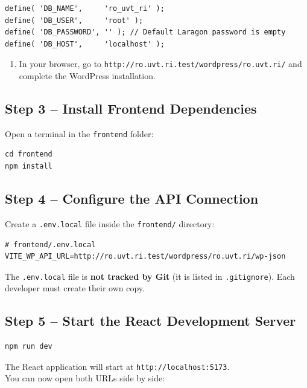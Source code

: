 \documentclass[11pt,a4paper]{article}
\begin{document}
\begin{lstlisting}
define( 'DB_NAME',     'ro_uvt_ri' );
define( 'DB_USER',     'root' );
define( 'DB_PASSWORD', '' ); // Default Laragon password is empty
define( 'DB_HOST',     'localhost' );
\end{lstlisting}

\begin{enumerate}[leftmargin=1.5em, resume]
    \item In your browser, go to \texttt{http://ro.uvt.ri.test/wordpress/ro.uvt.ri/} and complete the WordPress installation.
\end{enumerate}

\subsection{Step 3 -- Install Frontend Dependencies}

Open a terminal in the \texttt{frontend} folder:

\begin{lstlisting}
cd frontend
npm install
\end{lstlisting}

\subsection{Step 4 -- Configure the API Connection}

Create a \texttt{.env.local} file inside the \texttt{frontend/} directory:

\begin{lstlisting}
# frontend/.env.local
VITE_WP_API_URL=http://ro.uvt.ri.test/wordpress/ro.uvt.ri/wp-json
\end{lstlisting}

\begin{warningbox}
The \texttt{.env.local} file is \textbf{not tracked by Git} (it is listed
in \texttt{.gitignore}). Each developer must create their own copy.
\end{warningbox}

\subsection{Step 5 -- Start the React Development Server}

\begin{lstlisting}
npm run dev
\end{lstlisting}

The React application will start at \texttt{http://localhost:5173}. \\
You can now open both URLs side by side:
\end{document}

